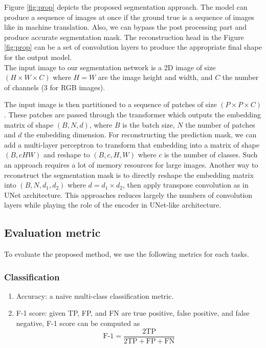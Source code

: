 \documentclass[review]{cvpr}
\begin{document}
Figure \ref{fig:prop} depicts the proposed segmentation approach. The model can produce a sequence of images at once if the ground true is a sequence of images like in machine translation. Also, we can bypass the post processing part and produce accurate segmentation mask. The reconstruction head in the Figure \ref{fig:prop} can be a set of convolution layers to produce the appropriate final shape for the output model. \\
The input image to our segmentation network is a 2D image of size $(H \times W \times C)$ where $H=W$ are the image height and width, and $C$ the number of channels (3 for RGB images). 

The input image is then partitioned to a sequence of patches of size $(P\times P\times C)$. These patches are passed through the transformer which outputs the embedding matrix of shape $(B, N, d)$,  where $B$ is the batch size, $N$ the number of patches and $d$ the embedding dimension. For reconstructing the prediction mask, we can add a multi-layer perceptron to transform that embedding into a matrix of shape $(B, cHW)$ and reshape to $(B, c, H, W)$ where $c$ is the number of classes. Such an approach requires a lot of memory resources for large images. Another way to reconstruct the segmentation mask is to directly reshape the embedding matrix into $(B, N, d_1, d_2)$ where $d = d_1\times d_2$, then apply transpose convolution as in UNet architecture. This approaches reduces largely the numbers of convolution layers while playing the role of the encoder in UNet-like architecture.


\subsection{Evaluation metric}
To evaluate the proposed method, we use the following metrics for each tasks.

\subsubsection{Classification}
\begin{enumerate}
    \item[\textbullet] Accuracy: a naive multi-class classification metric. 
    \item[\textbullet] F-1 score: given TP, FP, and FN are true positive, false positive, and false negative, F-1 score can be computed as 
    \begin{equation}
         \text{F-1} = \frac{2\text{TP}}{2\text{TP}+\text{FP}+ \text{FN}}
         \label{f1-metric}
    \end{equation}
\end{enumerate}
\end{document}
